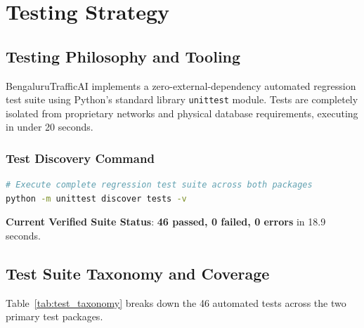 \documentclass[11pt,a4paper,oneside]{report}
\begin{document}


\chapter{Testing Strategy}

\section{Testing Philosophy and Tooling}
BengaluruTrafficAI implements a zero-external-dependency automated regression test suite using Python's standard library \texttt{unittest} module. Tests are completely isolated from proprietary networks and physical database requirements, executing in under 20 seconds.

\subsection{Test Discovery Command}
\begin{lstlisting}[language=bash]
# Execute complete regression test suite across both packages
python -m unittest discover tests -v
\end{lstlisting}
\textbf{Current Verified Suite Status}: \textbf{46 passed, 0 failed, 0 errors} in 18.9 seconds.

\section{Test Suite Taxonomy and Coverage}
Table~\ref{tab:test_taxonomy} breaks down the 46 automated tests across the two primary test packages.
\end{document}
